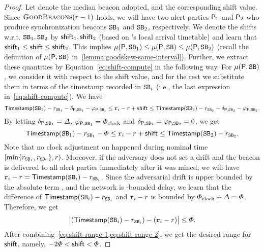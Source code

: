 \begin{proof}
    Let \beacon denote the median beacon \party adopted, and \shift the corresponding shift value.
    Since $\textsc{GoodBeacons}(r - 1)$ holds, we will have two alert parties $\mathsf{P}_1$ and $\mathsf{P}_2$ who produce synchronization beacons $\mathtt{SB}_1$ and $\mathtt{SB}_2$, respectively.
    We denote the shifts w.r.t. $\mathtt{SB}_1, \mathtt{SB}_2$ by $\mathsf{shift}_1, \mathsf{shift}_2$ (based on \party's local arrival timetable) and learn that $\mathsf{shift}_1 \le \mathsf{shift} \le \mathsf{shift}_2$.
    This implies  $\mu(\mathsf{P}, \mathtt{SB}_1) \le \mu(\mathsf{P}, \mathtt{SB}) \le \mu(\mathsf{P}, \mathtt{SB}_2)$ (recall the definition of $\mu(\mathsf{P}, \mathtt{SB})$ in~\cref{lemma:goodskew-same-interval}).
    Further, we extract these quantities by Equation~\eqref{eq:shift-compute} in the following way.
    For $\mu(\mathsf{P}, \mathtt{SB})$, we consider it with respect to the shift value, and for the rest we substitute them in terms of the timestamp recorded in $\mathtt{SB}_i$ (i.e., the last expression in~\cref{eq:shift-compute}).
    We have
    \[ \mathsf{Timestamp}(\mathtt{SB}_1) - r_{\mathtt{SB}_1} - \delta_{\mathsf{P}, \mathtt{SB}_1} - \varphi_{\mathsf{P}, \mathtt{SB}_1} \le \mathtt{r}_i - r + \mathsf{shift} \le \mathsf{Timestamp}(\mathtt{SB}_2) - r_{\mathtt{SB}_2} - \delta_{\mathsf{P}, \mathtt{SB}_2} - \varphi_{\mathsf{P}, \mathtt{SB}_2}. \]
    By letting $\delta_{\mathsf{P}, \mathtt{SB}_1} = \varDelta$, $\varphi_{\mathsf{P}, \mathtt{SB}_1} = \varPhi_{\mathrm{clock}}$ and $\delta_{\mathsf{P}, \mathtt{SB}_2} = \varphi_{\mathsf{P}, \mathtt{SB}_2}  = 0$, we get
    \begin{equation} \label{eq:shift-range-1}
        \mathsf{Timestamp}(\mathtt{SB}_1) - r_{\mathtt{SB}_1} - \varPhi \le \mathtt{r}_i - r + \mathsf{shift} \le \mathsf{Timestamp}(\mathtt{SB}_2) - r_{\mathtt{SB}_2}.
    \end{equation}
    Note that no clock adjustment on \party happened during nominal time $[\min \{ r_{\mathtt{SB}_1}, r_{\mathtt{SB}_2}\}, r)$.
    Moreover, if the adversary does not set a drift and the beacon is delivered to all alert parties immediately after it was mined, we will have $\mathtt{r}_i - r = \mathsf{Timestamp}(\mathtt{SB}_i) - r_{\mathtt{SB}_i}$.
    Since the adversarial drift is upper bounded by the absolute term \maxdrift, and the network is \delay-bounded delay, we learn that the difference of $\mathsf{Timestamp}(\mathtt{SB}_i) - r_{\mathtt{SB}_i}$ and $\mathtt{r}_i - r$ is bounded by $\varPhi_{\mathrm{clock}} + \varDelta = \varPhi$.
    Therefore, we get
    \begin{equation} \label{eq:shift-range-2}
        \big| (\mathsf{Timestamp}(\mathtt{SB}_i) - r_{\mathtt{SB}_i}) - (\mathtt{r}_i - r) \big| \le \varPhi.
    \end{equation}
    After combining~\cref{eq:shift-range-1,eq:shift-range-2}, we get the desired range for $\mathsf{shift}$, namely, $-2\varPhi < \mathsf{shift} < \varPhi$.
\end{proof}

